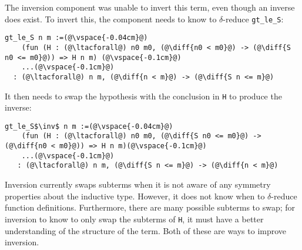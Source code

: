 The inversion component was unable to invert this term, even though an inverse does exist.
To invert this, the component needs to know to $\delta$-reduce \lstinline{gt_le_S}:

\begin{lstlisting}[language=coq]
  gt_le_S n m :=(@\vspace{-0.04cm}@)
    (fun (H : (@\ltacforall@) n0 m0, (@\diff{n0 < m0}@) -> (@\diff{S n0 <= m0}@)) => H n m) (@\vspace{-0.1cm}@)
    ...(@\vspace{-0.1cm}@)
  : (@\ltacforall@) n m, (@\diff{n < m}@) -> (@\diff{S n <= m}@)
\end{lstlisting}

It then needs to swap the hypothesis with the conclusion in \lstinline{H} to produce the inverse:

\begin{lstlisting}[language=coq]
  gt_le_S$\inv$ n m :=(@\vspace{-0.04cm}@)
    (fun (H : (@\ltacforall@) n0 m0, (@\diff{S n0 <= m0}@) -> (@\diff{n0 < m0}@)) => H n m)(@\vspace{-0.1cm}@)
    ...(@\vspace{-0.1cm}@)
   : (@\ltacforall@) n m, (@\diff{S n <= m}@) -> (@\diff{n < m}@)
\end{lstlisting}

Inversion currently swaps subterms when it is not
aware of any symmetry properties about the inductive type. However,
it does not know when to $\delta$-reduce function definitions. Furthermore, 
there are many possible subterms to swap;
for inversion to know to only swap the subterms of \lstinline{H}, it must have a better
understanding of the structure of the term. Both of these are ways to improve inversion.


